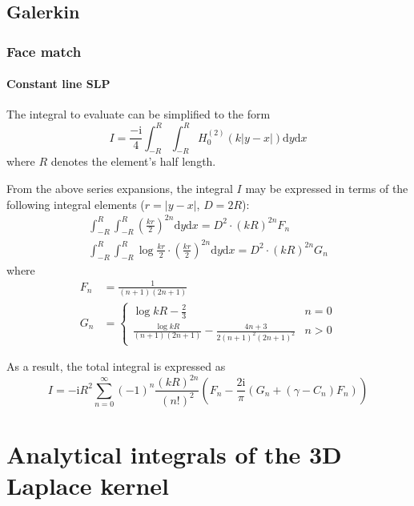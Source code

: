 \documentclass[a4paper,11pt]{article}
\newcommand{\td}{\mathrm{d}}
\newcommand{\ti}{\mathrm{i}}
\begin{document}
\subsection{Galerkin}

\subsubsection{Face match}

\paragraph{Constant line SLP}

The integral to evaluate can be simplified to the form
%
\begin{equation}
I = \frac{-\ti}{4} \int_{-R}^{R} \int_{-R}^R  H_0^{(2)}(k|y-x|)  \td y \td x
\end{equation}
%
where $R$ denotes the element's half length.

From the above series expansions, the integral $I$ may be expressed in terms of the following integral elements ($r=|y-x|$, $D = 2R$):
%
\begin{align}
\int_{-R}^{R} \int_{-R}^R  \left(\frac{kr}{2}\right)^{2n}  \td y \td x
= D^2 \cdot (kR)^{2n} F_n
\\
\int_{-R}^{R} \int_{-R}^R  \log \frac{kr}{2} \cdot \left(\frac{kr}{2}\right)^{2n}  \td y \td x
= D^2 \cdot (kR)^{2n} G_n
\end{align}
%
where
%
\begin{align}
F_n &= \frac{1}{(n+1)(2n+1)}
\\
G_n &= \begin{cases}
\log kR - \frac{2}{3} & n = 0 \\
\frac{\log kR}{(n+1)(2n+1)} - \frac{4n+3}{2(n+1)^2(2n+1)^2}& n > 0
\end{cases}
\end{align}

As a result, the total integral is expressed as
%
\begin{equation}
I = -\ti R^2
\sum_{n=0}^{\infty} (-1)^n \frac{(kR)^{2n}}{\left(n!\right)^2}
\left(
F_n
- \frac{2 \ti}{\pi}
\left(G_n + \left(\gamma - C_n \right) F_n \right)
\right)
\end{equation}


\section{Analytical integrals of the 3D Laplace kernel}
\end{document}
